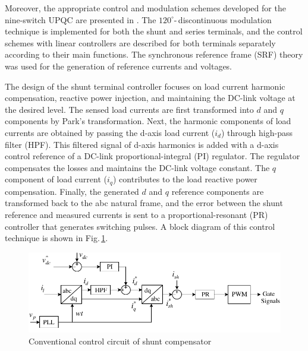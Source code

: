 Moreover, the appropriate control and modulation schemes developed for the nine-switch UPQC are presented in \cite{5713844}. The $120^{\circ}$-\,discontinuous modulation technique is implemented for both the shunt and series terminals, and the control schemes with linear controllers are described for both terminals separately according to their main functions. The synchronous reference frame (SRF) theory was used for the generation of reference currents and voltages.

The design of the shunt terminal controller focuses on load current harmonic compensation, reactive power injection, and maintaining the DC-link voltage at the desired level. The sensed load currents are first transformed into $d$ and $q$ components by Park's transformation. Next, the harmonic components of load currents are obtained by passing the d-axis load current ($i_d$) through high-pass filter (HPF). This filtered signal of d-axis harmonics is added with a d-axis control reference of a DC-link proportional-integral (PI) regulator. The regulator compensates the losses and maintains the DC-link voltage constant. The $q$ component of load current ($i_q$) contributes to the load reactive power compensation. Finally, the generated $d$ and $q$ reference components are transformed back to the abc natural frame, and the error between the shunt reference and measured currents is sent to a proportional-resonant (PR) controller that generates switching pulses. A block diagram of this control technique is shown in Fig.\,\ref{2.Shunt_control}.
\begin{figure}[ht]
	\centering	
	\includegraphics[scale=1]{figures/Chapter_1_2/fig4}
	\caption{Conventional control circuit of shunt compensator \cite{5713844}}
	\label{2.Shunt_control}
\end{figure}

